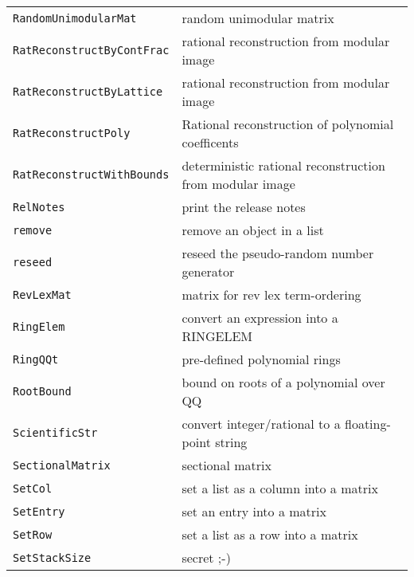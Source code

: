 \documentclass[a4paper]{mybook}
\begin{document}
\begin{center}
\begin{longtable}{ll}
{\verb~RandomUnimodularMat~} &
      random unimodular matrix\\
   
{\verb~RatReconstructByContFrac~} &
      rational reconstruction from modular image\\
   
{\verb~RatReconstructByLattice~} &
      rational reconstruction from modular image\\
   
{\verb~RatReconstructPoly~} &
      Rational reconstruction of polynomial coefficents\\
   
{\verb~RatReconstructWithBounds~} &
      deterministic rational reconstruction from modular image\\
   
{\verb~RelNotes~} &
      print the release notes\\
   
{\verb~remove~} &
      remove an object in a list\\
   
{\verb~reseed~} &
      reseed the pseudo-random number generator\\
   
{\verb~RevLexMat~} &
      matrix for rev lex term-ordering\\
   
{\verb~RingElem~} &
      convert an expression into a RINGELEM\\
   
{\verb~RingQQt~} &
      pre-defined polynomial rings\\
   
{\verb~RootBound~} &
      bound on roots of a polynomial over QQ\\
   
{\verb~ScientificStr~} &
      convert integer/rational to a floating-point string\\
   
{\verb~SectionalMatrix~} &
      sectional matrix \\
   
{\verb~SetCol~} &
      set a list as a column into a matrix\\
   
{\verb~SetEntry~} &
      set an entry into a matrix\\
   
{\verb~SetRow~} &
      set a list as a row into a matrix\\
   
{\verb~SetStackSize~} &
      secret ;-)\\
   

\end{longtable}
\end{center}
\end{document}
